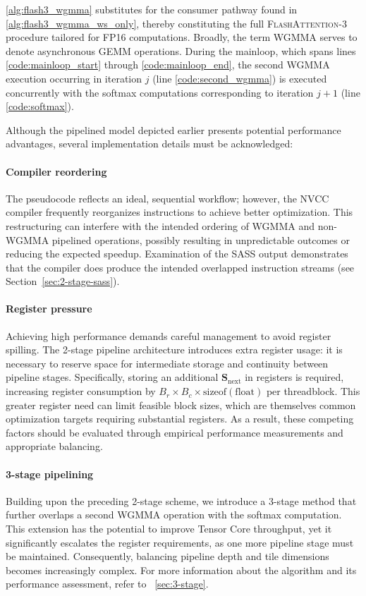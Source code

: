 \begin{algorithm}[H]
\begin{algorithmic}[1]
\cref{alg:flash3_wgmma} substitutes for the consumer pathway found in \cref{alg:flash3_wgmma_ws_only}, thereby constituting the full \textsc{FlashAttention-3} procedure tailored for FP16 computations. Broadly, the term WGMMA serves to denote asynchronous GEMM operations. During the mainloop, which spans lines \ref{code:mainloop_start} through \ref{code:mainloop_end}, the second WGMMA execution occurring in iteration $j$ (line \ref{code:second_wgmma}) is executed concurrently with the softmax computations corresponding to iteration $j+1$ (line \ref{code:softmax}).

Although the pipelined model depicted earlier presents potential performance advantages, several implementation details must be acknowledged:

\paragraph{Compiler reordering} The pseudocode reflects an ideal, sequential workflow; however, the NVCC compiler frequently reorganizes instructions to achieve better optimization. This restructuring can interfere with the intended ordering of WGMMA and non-WGMMA pipelined operations, possibly resulting in unpredictable outcomes or reducing the expected speedup. Examination of the SASS output demonstrates that the compiler does produce the intended overlapped instruction streams (see Section~\ref{sec:2-stage-sass}).

\paragraph{Register pressure} Achieving high performance demands careful management to avoid register spilling. The 2-stage pipeline architecture introduces extra register usage: it is necessary to reserve space for intermediate storage and continuity between pipeline stages. Specifically, storing an additional $\mathbf{S}_{\mathrm{next}}$ in registers is required, increasing register consumption by $B_r \times B_c \times \text{sizeof}(\text{float})$ per threadblock. This greater register need can limit feasible block sizes, which are themselves common optimization targets requiring substantial registers. As a result, these competing factors should be evaluated through empirical performance measurements and appropriate balancing.

\paragraph{3-stage pipelining} Building upon the preceding 2-stage scheme, we introduce a 3-stage method that further overlaps a second WGMMA operation with the softmax computation. This extension has the potential to improve Tensor Core throughput, yet it significantly escalates the register requirements, as one more pipeline stage must be maintained. Consequently, balancing pipeline depth and tile dimensions becomes increasingly complex. For more information about the algorithm and its performance assessment, refer to ~\cref{sec:3-stage}.


\end{algorithmic}
\end{algorithm}
